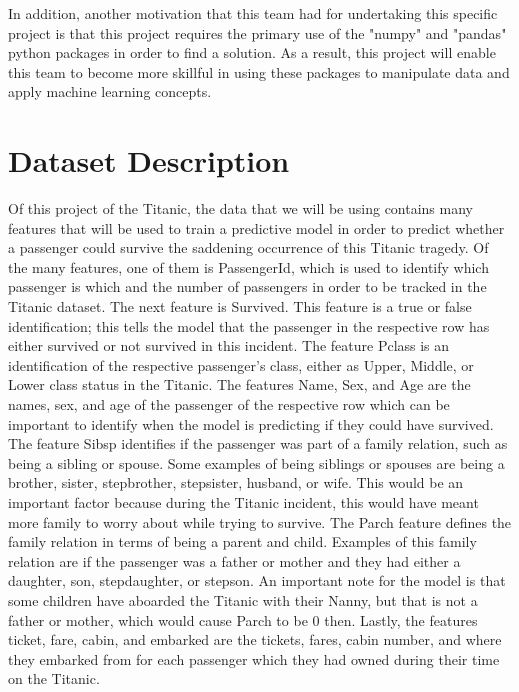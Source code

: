 \documentclass{APA}
\begin{document}
In addition, another motivation that this team had for undertaking this specific project is that this project requires the primary use of the "numpy" and "pandas" python packages in order to find a solution. As a result, this project will enable this team to become more skillful in using these packages to manipulate data and apply machine learning concepts.
\newpage



\section{Dataset Description}
	Of this project of the Titanic, the data that we will be using contains many features that will be used to train a predictive model in order to predict whether a passenger could survive the saddening occurrence of this Titanic tragedy. Of the many features, one of them is PassengerId, which is used to identify which passenger is which and the number of passengers in order to be tracked in the Titanic dataset. The next feature is Survived. This feature is a true or false identification; this tells the model that the passenger in the respective row has either survived or not survived in this incident. The feature Pclass is an identification of the respective passenger's class, either as Upper, Middle, or Lower class status in the Titanic. The features Name, Sex, and Age are the names, sex, and age of the passenger of the respective row which can be important to identify when the model is predicting if they could have survived. The feature Sibsp identifies if the passenger was part of a family relation, such as being a sibling or spouse. Some examples of being siblings or spouses are being a brother, sister, stepbrother, stepsister, husband, or wife. This would be an important factor because during the Titanic incident, this would have meant more family to worry about while trying to survive. The Parch feature defines the family relation in terms of being a parent and child. Examples of this family relation are if the passenger was a father or mother and they had either a daughter, son, stepdaughter, or stepson. An important note for the model is that some children have aboarded the Titanic with their Nanny, but that is not a father or mother, which would cause Parch to be 0 then. Lastly, the features ticket, fare, cabin, and embarked are the tickets, fares, cabin number, and where they embarked from for each passenger which they had owned during their time on the Titanic. 

\newpage
\end{document}
